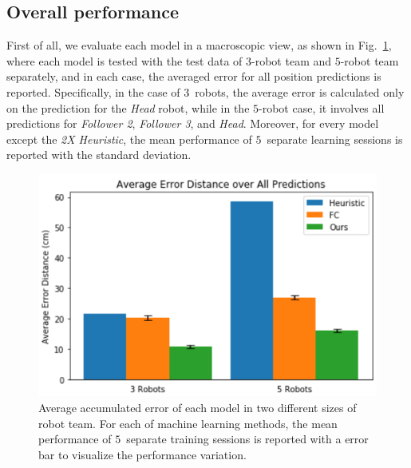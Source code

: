 \documentclass[letterpaper, 10 pt, conference]{ieeeconf}  %
\begin{document}



	\subsection{Overall performance}
	\label{sec:overall_performance}

    First of all, we evaluate each model in a macroscopic view, as shown
    in Fig.~\ref{fig:macro_eval}, where each model is tested with the
    test data of $3$-robot team and $5$-robot team separately, and in
    each case, the averaged error for all position predictions is
    reported. Specifically, in the case of $3$~robots, the average error
    is calculated only on the prediction for the \emph{Head} robot,
    while in the $5$-robot case, it involves all predictions for
    \emph{Follower 2}, \emph{Follower 3}, and \emph{Head}. Moreover, for
    every model except the \emph{2X Heuristic}, the mean performance of
    $5$~separate learning sessions is reported with the standard
    deviation.
	\begin{figure}[t]
        \centering
        \includegraphics[width=1.\columnwidth]{fig_macro_eval}
        \caption{Average accumulated error of each model in two different sizes of robot team.
            For each of machine learning methods, the mean performance of $5$~separate training
            sessions is reported with a error bar to visualize the performance variation.
        }
        \label{fig:macro_eval}
	\end{figure}
\end{document}
